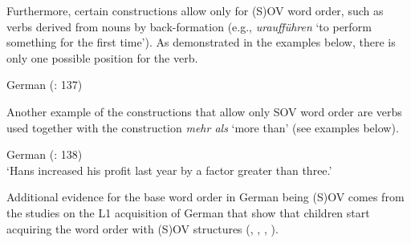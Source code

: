 Furthermore, certain constructions allow only for (S)OV word order, such as verbs derived from nouns by back-formation (e.g., \textit{uraufführen} ‘to perform something for the first time’). As demonstrated in the examples  below, there is only one possible position for the verb.

\ea\label{ex:key:21} German (\citealt{Muller2023}: 137) \\
\z
\z

Another example of the constructions that allow only SOV word order are verbs used together with the construction \textit{mehr als} ‘more than’ (see examples  below).

\ea \label{ex:key:22} German (\citealt{Muller2023}: 138) \\
\glt ‘Hans increased his profit last year by a factor greater than three.’
\z
\z

Additional evidence for the base word order in German being (S)OV comes from the studies on the L1 acquisition of German that show that children start acquiring the word order with (S)OV structures (\citealt{ClahsenMuysken1986}, \citealt{Jordens1988}, \citealt{SchulzEtAl2008}, \citealt{TracyThoma2009}).


